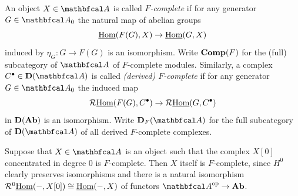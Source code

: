 \begin{definition}[$F$-Completeness]
	An object $X\in\category A$ is called \emph{$F$-complete} if for any generator $G\in\category A_0$ the natural map of abelian groups
		$${\underline{\operatorname{Hom}}}(F(G), X) \to {\underline{\operatorname{Hom}}}(G, X)$$
	induced by $\eta_G\colon G\to F(G)$ is an isomorphism. Write ${{\mathbf{Comp}}(F)}$ for the (full) subcategory of $\category A$ of $F$-complete modules. Similarly, a complex $C^\bullet \in \derived{\category A}$ is called \emph{(derived) $F$-complete} if for any generator $G\in\category A_0$ the induced map
		$$\mathcal{R}{\underline{\operatorname{Hom}}}(F(G), C^\bullet) \to \mathcal{R}{\underline{\operatorname{Hom}}}(G, C^\bullet)$$
	in ${{\mathbf{D}}({{\mathbf{Ab}}})}$ is an isomorphism. Write $\categoryname{D}_F(\category A)$ for the full subcategory of $\derived{\category{A}}$ of all derived $F$-complete complexes.
\end{definition}

\begin{remark}
	Suppose that $X\in\category{A}$ is an object such that the complex $X[0]$ concentrated in degree $0$ is $F$-complete. Then $X$ itself is $F$-complete, since $H^0$ clearly preserves isomorphisms and there is a natural isomorphism $\mathcal{R}^0{\underline{\operatorname{Hom}}}(-, X[0]) \cong {\underline{\operatorname{Hom}}}(-, X)$ of functors $\category{A}^\op \to \Ab$.
\end{remark}

